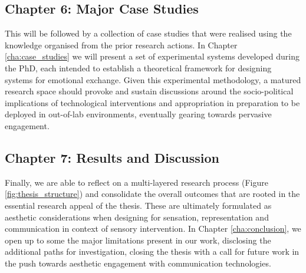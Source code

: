 \subsection{Chapter 6: Major Case Studies}

This will be followed by a collection of case studies that were realised using the knowledge organised from the prior research actions. In Chapter \ref{cha:case_studies} we will present a set of experimental systems developed during the PhD, each intended to establish a theoretical framework for designing systems for emotional exchange. Given this experimental methodology, a matured research space should provoke and sustain discussions around the socio-political implications of technological interventions and appropriation in preparation to be deployed in out-of-lab environments, eventually gearing towards pervasive engagement.

\subsection{Chapter 7: Results and Discussion}

Finally, we are able to reflect on a multi-layered research process (Figure \ref{fig:thesis_structure}) and consolidate the overall outcomes that are rooted in the essential research appeal of the thesis. These are ultimately formulated as aesthetic considerations when designing for sensation, representation and communication in context of sensory intervention. In Chapter \ref{cha:conclusion}, we open up to some the major limitations present in our work, disclosing the additional paths for investigation, closing the thesis with a call for future work in the push towards aesthetic engagement with communication technologies.


